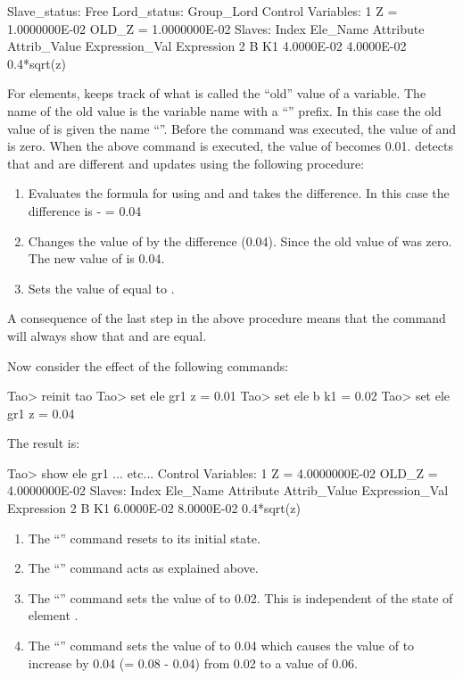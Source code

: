 \documentclass{hitec}     %
\begin{document}
{\begin{code}
Slave_status: Free
Lord_status:  Group_Lord
Control Variables:
    1   Z  =  1.0000000E-02           OLD_Z  =  1.0000000E-02
Slaves:
   Index   Ele_Name  Attribute   Attrib_Value  Expression_Val    Expression
       2   B         K1            4.0000E-02      4.0000E-02    0.4*sqrt(z)
\end{code}
For  elements, \bmad keeps track of what is called the ``old'' value of a variable. The
name of the old value is the variable name with a ``'' prefix. In this case the old value
of  is given the name ``''. Before the  command was executed, the
value of  and  is zero. When the above  command is executed, the
value of  becomes 0.01. \bmad detects that  and  are different and updates
 using the following procedure: \vspace{-5 pt}
\begin{enumerate}
\item
Evaluates the formula for  using  and  and takes the difference.
In this case the difference is  -  = 0.04
\item
Changes the value of  by the difference (0.04).
Since the old value of  was zero. The new value of  is 0.04.
\item
Sets the value of  equal to .
\end{enumerate}
A consequence of the last step in the above procedure means that the  command will
always show that  and  are equal.

Now consider the effect of the following commands:
\begin{code}
Tao> reinit tao
Tao> set ele gr1 z = 0.01
Tao> set ele b k1 = 0.02
Tao> set ele gr1 z = 0.04
\end{code}

The result is:

\begin{code}
Tao> show ele gr1
... etc...
Control Variables:
    1   Z  =  4.0000000E-02           OLD_Z  =  4.0000000E-02
Slaves:
   Index   Ele_Name  Attribute   Attrib_Value  Expression_Val    Expression
       2   B         K1            6.0000E-02      8.0000E-02    0.4*sqrt(z)
\end{code}
\vspace{-5 pt}
\begin{enumerate}
\item
The ``'' command resets \tao to its initial state.
\item
The ``'' command acts as explained above.
\item
The ``'' command sets the value of  to 0.02. This is independent of the state of element .
\item
The ``'' command sets the value of  to 0.04 which causes the
value of  to increase by 0.04 (= 0.08 - 0.04) from 0.02 to a value of 0.06.
\end{enumerate}

}
\end{document}
